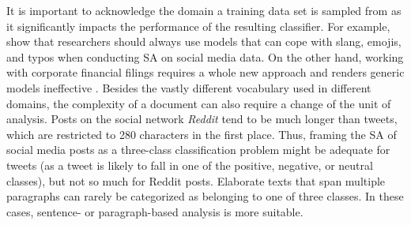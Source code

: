  It is important to acknowledge the domain a training data set is sampled from as it significantly impacts the performance of the resulting classifier. For example,  show that researchers should always use models that can cope with slang, emojis, and typos when conducting SA on social media data. On the other hand, working with corporate financial filings requires a whole new approach and renders generic models ineffective . Besides the vastly different vocabulary used in different domains, the complexity of a document can also require a change of the unit of analysis. Posts on the social network \emph{Reddit} tend to be much longer than tweets, which are restricted to 280 characters in the first place. Thus, framing the SA of social media posts as a three-class classification problem might be adequate for tweets (as a tweet is likely to fall in one of the positive, negative, or neutral classes), but not so much for Reddit posts. Elaborate texts that span multiple paragraphs can rarely be categorized as belonging to one of three classes. In these cases, sentence- or paragraph-based analysis is more suitable.
 




